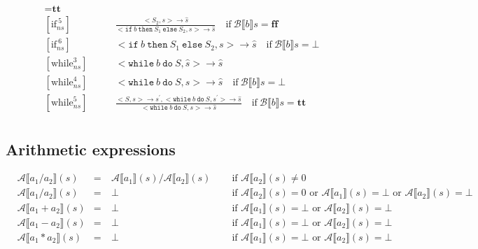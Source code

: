 \documentclass[11pt,oneside,a4paper]{article}
\newcommand{\SExp}[2]{\mathcal{#1}\llbracket #2 \rrbracket}
\newcommand{\AExp}[2]{\SExp{A}{#1}(#2)}
\begin{document}
\begin{align*}
= \textbf{tt}\\
[\text{if}_{ns}^{\:5}] \quad \quad & \frac{<S_2, s> \rightarrow \hat{s}}
{ <\texttt{if}\:b\: \texttt{then}\:  S_1 \: \texttt{else} \: S_2, s> 
\rightarrow \hat{s}} \quad \text{if} \: \mathcal{B} \llbracket b \rrbracket s
= \textbf{ff}\\
[\text{if}_{ns}^{\:6}] \quad \quad & <\texttt{if}\:b\: \texttt{then}\:  S_1 \: 
\texttt{else} \: S_2, s> \rightarrow \hat{s} \quad 
\text{if} \: \mathcal{B} \llbracket b \rrbracket s
= \bot \\
[\text{while}_{ns}^3] \quad \quad & <\texttt{while}\: b \:\texttt{do}\: S, 
\hat{s}> \rightarrow \hat{s} \\
[\text{while}_{ns}^4] \quad \quad & 
<\texttt{while}\: b \:\texttt{do}\: S, s> \rightarrow \hat{s} 
\quad \text{if} \: \mathcal{B} \llbracket b \rrbracket s = \bot \\
[\text{while}_{ns}^5] \quad \quad & 
\frac{<S,s> \rightarrow s^{'}, <\texttt{while}\: b \: \texttt{do} \: S, s^{'}>
\rightarrow \hat{s}}
{<\texttt{while}\: b \: \texttt{do}\: S, s> \rightarrow \hat{s}} 
\quad \text{if} \: \mathcal{B} \llbracket b \rrbracket s = \textbf{tt} \\
\end{align*}
\endgroup

\subsection*{Arithmetic expressions}
\begin{align*}
&\mathcal{A}\llbracket a_1 / a_2 \rrbracket(s) &=&\: \mathcal{A}\llbracket a_1
\rrbracket(s) / \mathcal{A}\llbracket a_2 \rrbracket(s)& &\text{ if }
\mathcal{A}\llbracket a_2 \rrbracket(s) \neq 0 \\
&\AExp{a_1 / a_2}{s} &=&\: \bot& &\text{ if } 
\AExp{a_2}{s} = 0 \text{ or } \AExp{a_1}{s} = \bot 
\text{ or } \AExp{a_2}{s} = \bot \\
&\AExp{a_1 + a_2}{s} &=&\: \bot &\: &\text{ if } \AExp{a_1}{s} = \bot 
\text{ or } \AExp{a_2}{s} = \bot \\
&\AExp{a_1 - a_2}{s} &=&\: \bot &\: &\text{ if } \AExp{a_1}{s} = \bot 
\text{ or } \AExp{a_2}{s} = \bot \\
&\AExp{a_1 * a_2}{s} &=&\: \bot &\: &\text{ if } \AExp{a_1}{s} = \bot 
\text{ or } \AExp{a_2}{s} = \bot \\
\end{align*}
\end{document}
